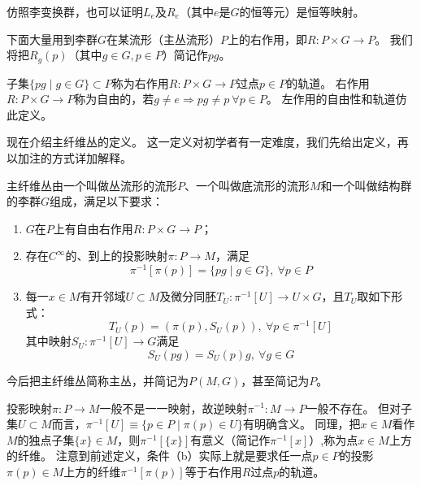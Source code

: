 \begin{note}
    仿照李变换群，也可以证明$L_e$及$R_e$（其中$e$是$G$的恒等元）是恒等映射。
\end{note}

下面大量用到李群$G$在某流形（主丛流形）$P$上的右作用，即$R \colon P \times G \to P$。
我们将把$R_g(p)$（其中$g \in G, p \in P$）简记作$pg$。

\begin{definition}
    子集$\{pg \mid g \in G\} \subset P$称为右作用$R \colon P \times G \to P$过点$p \in P$的轨道。
    右作用$R \colon P \times G \to P$称为自由的，若$g \neq e \Rightarrow pg \neq p ~ \forall p \in P$。
    左作用的自由性和轨道仿此定义。
\end{definition}

现在介绍主纤维丛的定义。
这一定义对初学者有一定难度，我们先给出定义，再以加注的方式详加解释。

\begin{definition}
    主纤维丛由一个叫做丛流形的流形$P$、一个叫做底流形的流形$M$和一个叫做结构群的李群$G$组成，满足以下要求：
    \begin{enumerate}[（a）]
        \item $G$在$P$上有自由右作用$R \colon P \times G \to P$；
        \item 存在$C^\infty$的、到上的投影映射$\pi \colon P \to M$，满足
        $$\pi^{-1}[\pi(p)] = \{pg \mid g \in G\}, ~ \forall p \in P$$
        \item 每一$x \in M$有开邻域$U \subset M$及微分同胚$T_U \colon \pi^{-1}[U] \to U \times G$，且$T_U$取如下形式：
        $$T_U(p) = (\pi(p), S_U(p)), ~ \forall p \in \pi^{-1}[U]$$
        其中映射$S_U \colon \pi^{-1}[U] \to G$满足
        $$S_U(pg) = S_U(p)g, ~ \forall g \in G$$
    \end{enumerate}
\end{definition}

\begin{note}
    今后把主纤维丛简称主丛，并简记为$P(M, G)$，甚至简记为$P$。
\end{note}

\begin{note}
    投影映射$\pi \colon P \to M$一般不是一一映射，故逆映射$\pi^{-1} \colon M \to P$一般不存在。
    但对子集$U \subset M$而言，$\pi^{-1}[U] \equiv \{p \in P \mid \pi(p) \in U\}$有明确含义。
    同理，把$x \in M$看作$M$的独点子集$\{x\} \in M$，则$\pi^{-1}[\{x\}]$有意义（简记作$\pi^{-1}[x]$）,称为点$x \in M$上方的纤维。
    注意到前述定义，条件（b）实际上就是要求任一点$p \in P$的投影$\pi(p) \in M$上方的纤维$\pi^{-1}[\pi(p)]$等于右作用$R$过点$p$的轨道。
\end{note}

